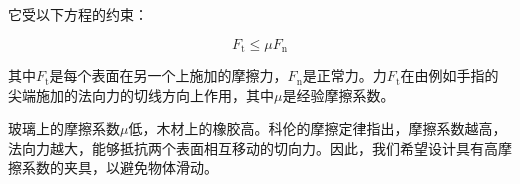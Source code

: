 它受以下方程的约束：

\begin{equation}
F_\mathrm{t} \leq \mu F_\mathrm{n}
\end{equation}



其中$F_\mathrm{t}$是每个表面在另一个上施加的摩擦力，$F_\mathrm{n}$是正常力。力$F_\mathrm{t}$在由例如手指的尖端施加的法向力的切线方向上作用，其中$\mu$是经验摩擦系数。

玻璃上的摩擦系数$\mu$低，木材上的橡胶高。科伦的摩擦定律指出，摩擦系数越高，法向力越大，能够抵抗两个表面相互移动的切向力。因此，我们希望设计具有高摩擦系数的夹具，以避免物体滑动。



